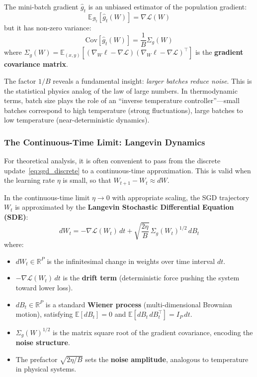 \documentclass[
  journal=largetwo,
  year=2025,
  volume=37,
]{cup-journal}
\begin{document}
The mini-batch gradient $\hat{g}_t$ is an unbiased estimator of the population gradient:
\begin{equation}
    \mathbb{E}_{\mathcal{B}_t}[\hat{g}_t(W)] = \nabla \mathcal{L}(W)
\end{equation}
but it has non-zero variance:
\begin{equation}
    \text{Cov}[\hat{g}_t(W)] = \frac{1}{B} \Sigma_g(W)
\end{equation}
where $\Sigma_g(W) = \mathbb{E}_{(x,y)}[(\nabla_W \ell - \nabla \mathcal{L})(\nabla_W \ell - \nabla \mathcal{L})^\top]$ is the \textbf{gradient covariance matrix}.

\begin{remark}
The factor $1/B$ reveals a fundamental insight: \textit{larger batches reduce noise}. This is the statistical physics analog of the law of large numbers. In thermodynamic terms, batch size plays the role of an ``inverse temperature controller''---small batches correspond to high temperature (strong fluctuations), large batches to low temperature (near-deterministic dynamics).
\end{remark}

\subsubsection{The Continuous-Time Limit: Langevin Dynamics}

For theoretical analysis, it is often convenient to pass from the discrete update~\eqref{eq:sgd_discrete} to a continuous-time approximation. This is valid when the learning rate $\eta$ is small, so that $W_{t+1} - W_t \approx dW$.

\begin{definition}\label{def:langevin_sgd}
In the continuous-time limit $\eta \to 0$ with appropriate scaling, the SGD trajectory $W_t$ is approximated by the \textbf{Langevin Stochastic Differential Equation (SDE)}:
\begin{equation}\label{eq:langevin_formal}
    \boxed{dW_t = -\nabla \mathcal{L}(W_t) \, dt + \sqrt{\frac{2\eta}{B}} \, \Sigma_g(W_t)^{1/2} \, dB_t}
\end{equation}
where:
\begin{itemize}
    \item $dW_t \in \mathbb{R}^P$ is the infinitesimal change in weights over time interval $dt$.
    \item $-\nabla \mathcal{L}(W_t) \, dt$ is the \textbf{drift term} (deterministic force pushing the system toward lower loss).
    \item $dB_t \in \mathbb{R}^P$ is a standard \textbf{Wiener process} (multi-dimensional Brownian motion), satisfying $\mathbb{E}[dB_t] = 0$ and $\mathbb{E}[dB_t \, dB_t^\top] = I_P \, dt$.
    \item $\Sigma_g(W)^{1/2}$ is the matrix square root of the gradient covariance, encoding the \textbf{noise structure}.
    \item The prefactor $\sqrt{2\eta/B}$ sets the \textbf{noise amplitude}, analogous to temperature in physical systems.
\end{itemize}
\end{definition}
\end{document}
